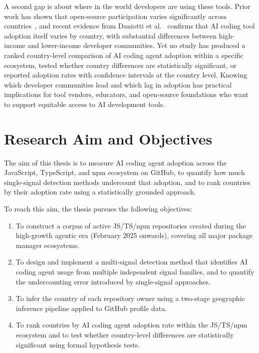 A second gap is about where in the world developers are using these tools.
Prior work has shown that open-source participation varies significantly across
countries~\cite{wachs2022}, and recent evidence from Daniotti et
al.~\cite{daniotti2025} confirms that AI coding tool adoption itself varies
by country, with substantial differences between high-income and lower-income
developer communities. Yet no study has produced a ranked country-level
comparison of AI coding agent adoption within a specific ecosystem, tested
whether country differences are statistically significant, or reported
adoption rates with confidence intervals at the country level. Knowing which
developer communities lead and which lag in adoption has practical implications
for tool vendors, educators, and open-source foundations who want to support
equitable access to AI development tools.

\section{Research Aim and Objectives}
\label{sec:intro:aim}

The aim of this thesis is to measure AI coding agent adoption across the
JavaScript, TypeScript, and npm ecosystem on GitHub, to quantify how much
single-signal detection methods undercount that adoption, and to rank
countries by their adoption rate using a statistically grounded approach.

To reach this aim, the thesis pursues the following objectives:

\begin{enumerate}
  \item To construct a corpus of active JS/TS/npm repositories created during
    the high-growth agentic era (February 2025 onwards), covering all major
    package manager ecosystems.

  \item To design and implement a multi-signal detection method that identifies
    AI coding agent usage from multiple independent signal families, and to
    quantify the undercounting error introduced by single-signal approaches.

  \item To infer the country of each repository owner using a two-stage
    geographic inference pipeline applied to GitHub profile data.

  \item To rank countries by AI coding agent adoption rate within the
    JS/TS/npm ecosystem and to test whether country-level differences are
    statistically significant using formal hypothesis tests.
\end{enumerate}

